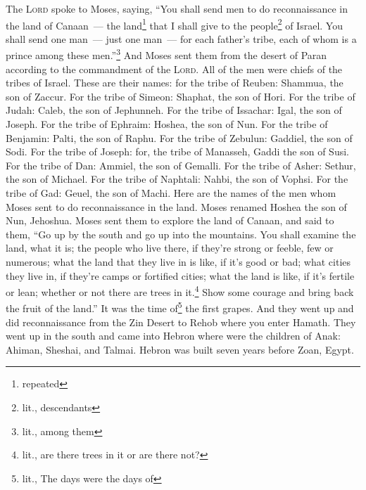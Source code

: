 
\begin{enumerate*}[mode=unboxed]
     The \textsc{Lord} spoke to Moses, saying,%
     ``You shall send men to do reconnaissance in the land of Canaan~--- the land\footnote{repeated} that I shall give to the people\footnote{lit., descendants} of Israel. You shall send one man~--- just one man~--- for each father's tribe, each of whom is a prince among these men.''\footnote{lit., among them}%
     And Moses sent them from the desert of Paran according to the commandment of the \textsc{Lord}. All of the men were chiefs of the tribes of Israel.%
     These are their names: for the tribe of Reuben: Shammua, the son of Zaccur.%
     For the tribe of Simeon: Shaphat, the son of Hori.%
     For the tribe of Judah: Caleb, the son of Jephunneh.%
     For the tribe of Issachar: Igal, the son of Joseph.%
     For the tribe of Ephraim: Hoshea, the son of Nun.%
     For the tribe of Benjamin: Palti, the son of Raphu.%
     For the tribe of Zebulun: Gaddiel, the son of Sodi.%
     For the tribe of Joseph: for, the tribe of Manasseh, Gaddi the son of Susi.%
     For the tribe of Dan: Ammiel, the son of Gemalli.%
     For the tribe of Asher: Sethur, the son of Michael.%
     For the tribe of Naphtali: Nahbi, the son of Vophsi.%
     For the tribe of Gad: Geuel, the son of Machi.%
     Here are the names of the men whom Moses sent to do reconnaissance in the land. Moses renamed Hoshea the son of Nun, Jehoshua.%
     Moses sent them to explore the land of Canaan, and said to them, ``Go up by the south and go up into the mountains.%
     You shall examine the land, what it is; the people who live there, if they're strong or feeble, few or numerous;%
     what the land that they live in is like, if it's good or bad; what cities they live in, if they're camps or fortified cities;%
     what the land is like, if it's fertile or lean; whether or not there are trees in it.\footnote{lit., are there trees in it or are there not?} Show some courage and bring back the fruit of the land.'' It was the time of\footnote{lit., The days were the days of} the first grapes.%
     And they went up and did reconnaissance from the Zin Desert to Rehob where you enter Hamath.%
     They went up in the south and came into Hebron where were the children of Anak: Ahiman, Sheshai, and Talmai. Hebron was built seven years before Zoan, Egypt.%

\end{enumerate*}
